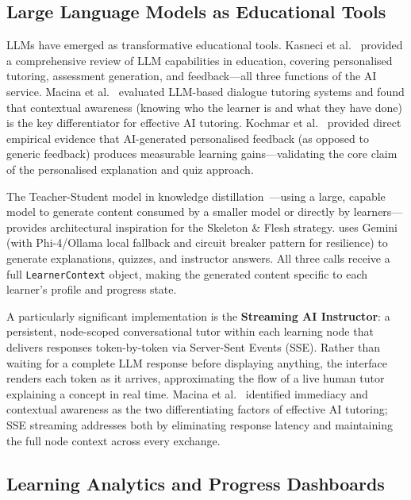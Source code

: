 \subsection{Large Language Models as Educational Tools}
\label{sec:llm-education}

LLMs have emerged as transformative educational tools. Kasneci et al.~\cite{kasneci2023} provided a comprehensive review of LLM capabilities in education, covering personalised tutoring, assessment generation, and feedback---all three functions of the \projectname{} AI service. Macina et al.~\cite{macina2023} evaluated LLM-based dialogue tutoring systems and found that contextual awareness (knowing who the learner is and what they have done) is the key differentiator for effective AI tutoring. Kochmar et al.~\cite{kochmar2022} provided direct empirical evidence that AI-generated personalised feedback (as opposed to generic feedback) produces measurable learning gains---validating the core claim of the personalised explanation and quiz approach.

The Teacher-Student model in knowledge distillation~\cite{hinton2015}---using a large, capable model to generate content consumed by a smaller model or directly by learners---provides architectural inspiration for the Skeleton \& Flesh strategy. \projectname{} uses Gemini (with Phi-4/Ollama local fallback and circuit breaker pattern for resilience) to generate explanations, quizzes, and instructor answers. All three calls receive a full \texttt{LearnerContext} object, making the generated content specific to each learner's profile and progress state.

A particularly significant implementation is the \textbf{Streaming AI Instructor}: a persistent, node-scoped conversational tutor within each learning node that delivers responses token-by-token via Server-Sent Events (SSE). Rather than waiting for a complete LLM response before displaying anything, the interface renders each token as it arrives, approximating the flow of a live human tutor explaining a concept in real time. Macina et al.~\cite{macina2023} identified immediacy and contextual awareness as the two differentiating factors of effective AI tutoring; SSE streaming addresses both by eliminating response latency and maintaining the full node context across every exchange.

\subsection{Learning Analytics and Progress Dashboards}
\label{sec:learning-analytics}

